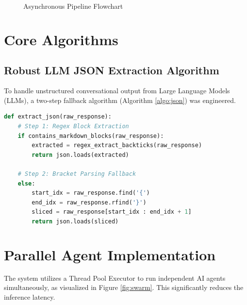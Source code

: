 \documentclass[11pt, a4paper]{article}
\begin{document}
\begin{figure}[H]
\centering
{}
\caption{Asynchronous Pipeline Flowchart}
\label{fig:flowchart}
\end{figure}

\section{Core Algorithms}

\subsection{Robust LLM JSON Extraction Algorithm}
To handle unstructured conversational output from Large Language Models (LLMs), a two-step fallback algorithm (Algorithm \ref{algo:json}) was engineered.

\begin{lstlisting}[language=Python, caption=Robust Two-Step JSON Extraction Fallback, label=algo:json]
def extract_json(raw_response):
    # Step 1: Regex Block Extraction
    if contains_markdown_blocks(raw_response):
        extracted = regex_extract_backticks(raw_response)
        return json.loads(extracted)
        
    # Step 2: Bracket Parsing Fallback
    else:
        start_idx = raw_response.find('{')
        end_idx = raw_response.rfind('}')
        sliced = raw_response[start_idx : end_idx + 1]
        return json.loads(sliced)
\end{lstlisting}

\section{Parallel Agent Implementation}
The system utilizes a Thread Pool Executor to run independent AI agents simultaneously, as visualized in Figure \ref{fig:swarm}. This significantly reduces the inference latency.
\end{document}
